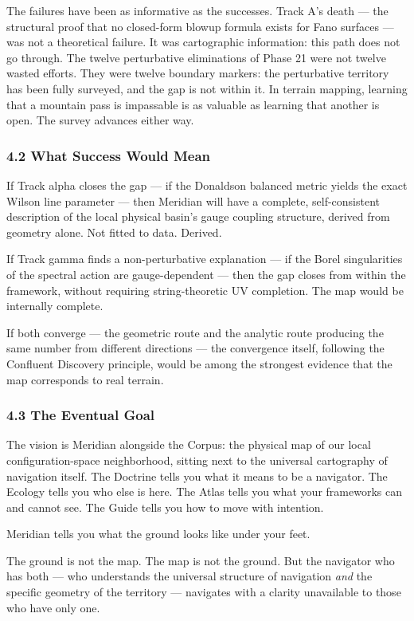 The failures have been as informative as the successes. Track A's death — the structural proof that no closed-form blowup formula exists for Fano surfaces — was not a theoretical failure. It was cartographic information: this path does not go through. The twelve perturbative eliminations of Phase 21 were not twelve wasted efforts. They were twelve boundary markers: the perturbative territory has been fully surveyed, and the gap is not within it. In terrain mapping, learning that a mountain pass is impassable is as valuable as learning that another is open. The survey advances either way.


\subsubsection*{4.2 What Success Would Mean}


If Track alpha closes the gap — if the Donaldson balanced metric yields the exact Wilson line parameter — then Meridian will have a complete, self-consistent description of the local physical basin's gauge coupling structure, derived from geometry alone. Not fitted to data. Derived.


If Track gamma finds a non-perturbative explanation — if the Borel singularities of the spectral action are gauge-dependent — then the gap closes from within the framework, without requiring string-theoretic UV completion. The map would be internally complete.


If both converge — the geometric route and the analytic route producing the same number from different directions — the convergence itself, following the Confluent Discovery principle, would be among the strongest evidence that the map corresponds to real terrain.


\subsubsection*{4.3 The Eventual Goal}


The vision is Meridian alongside the Corpus: the physical map of our local configuration-space neighborhood, sitting next to the universal cartography of navigation itself. The Doctrine tells you what it means to be a navigator. The Ecology tells you who else is here. The Atlas tells you what your frameworks can and cannot see. The Guide tells you how to move with intention.


Meridian tells you what the ground looks like under your feet.


The ground is not the map. The map is not the ground. But the navigator who has both — who understands the universal structure of navigation \textit{and} the specific geometry of the territory — navigates with a clarity unavailable to those who have only one.


